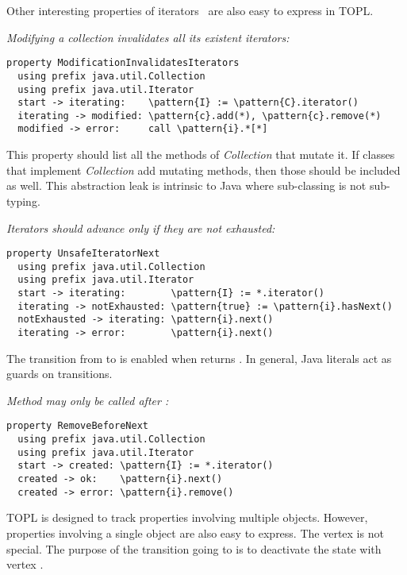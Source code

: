 \documentclass[preprint]{sigplanconf} %
\newcommand{\delimitVerbatim}{\par\nobreak\smallskip\noindent}
\newcommand{\pattern}[1]{\ensuremath{\mathtt{\underline{#1}}}}
\theoremstyle{definition}
\theoremstyle{remark}
\begin{document}
Other interesting properties of iterators~\cite{dblp:conf/oopsla/naeeml08,dblp:conf/sigsoft/boddenlh08,haack2009} are also easy to express in TOPL\null.

\medskip\emph{Modifying a collection invalidates all its existent iterators:}
\delimitVerbatim
\begin{Verbatim}[commandchars=\\\{\}]
property ModificationInvalidatesIterators
  using prefix java.util.Collection
  using prefix java.util.Iterator
  start -> iterating:    \pattern{I} := \pattern{C}.iterator()
  iterating -> modified: \pattern{c}.add(*), \pattern{c}.remove(*)
  modified -> error:     call \pattern{i}.*[*]
\end{Verbatim}
\delimitVerbatim
This property should list all the methods of \textit{Collection} that mutate it.
If classes that implement \textit{Collection} add mutating methods, then those should be included as well.
This abstraction leak is intrinsic to Java where sub-classing is not sub-typing.

\medskip\emph{Iterators should advance only if they are not exhausted:}
\delimitVerbatim
\begin{Verbatim}[commandchars=\\\{\}]
property UnsafeIteratorNext
  using prefix java.util.Collection
  using prefix java.util.Iterator
  start -> iterating:        \pattern{I} := *.iterator()
  iterating -> notExhausted: \pattern{true} := \pattern{i}.hasNext()
  notExhausted -> iterating: \pattern{i}.next()
  iterating -> error:        \pattern{i}.next()
\end{Verbatim}
\delimitVerbatim
The transition from \Verb@iterating@ to \Verb@notExhausted@ is enabled when \Verb@hasNext@ returns \Verb@true@.
In general, Java literals act as guards on transitions.

\medskip\emph{Method \Verb@remove@ may only be called after \Verb@next@:}
\delimitVerbatim
\begin{Verbatim}[commandchars=\\\{\}]
property RemoveBeforeNext
  using prefix java.util.Collection
  using prefix java.util.Iterator
  start -> created: \pattern{I} := *.iterator()
  created -> ok:    \pattern{i}.next()
  created -> error: \pattern{i}.remove()
\end{Verbatim}
\delimitVerbatim
TOPL is designed to track properties involving multiple objects.
However, properties involving a single object are also easy to express.
The vertex \Verb@ok@ is not special.
The purpose of the transition going to \Verb@ok@ is to deactivate the state with vertex \Verb@created@.
\end{document}
